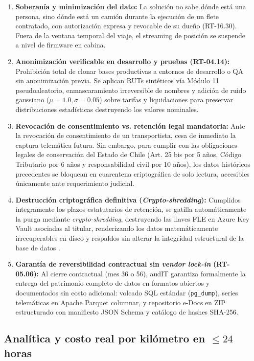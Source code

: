 \begin{enumerate}
    \item \textbf{Soberanía y minimización del dato:} La solución no sabe dónde está una persona, sino dónde está un camión durante la ejecución de un flete contratado, con autorización expresa y revocable de su dueño (RT-16.30). Fuera de la ventana temporal del viaje, el streaming de posición se suspende a nivel de firmware en cabina.
    \item \textbf{Anonimización verificable en desarrollo y pruebas (RT-04.14):} Prohibición total de clonar bases productivas a entornos de desarrollo o QA sin anonimización previa. Se aplican RUTs sintéticos vía Módulo 11 pseudoaleatorio, enmascaramiento irreversible de nombres y adición de ruido gaussiano ($\mu = 1.0, \sigma = 0.05$) sobre tarifas y liquidaciones para preservar distribuciones estadísticas destruyendo los valores nominales.
    \item \textbf{Revocación de consentimiento vs. retención legal mandatoria:} Ante la revocación de consentimiento de un transportista, cesa de inmediato la captura telemática futura. Sin embargo, para cumplir con las obligaciones legales de conservación del Estado de Chile (Art. 25 bis por 5 años, Código Tributario por 6 años y responsabilidad civil por 10 años), los datos históricos precedentes se bloquean en cuarentena criptográfica de solo lectura, accesibles únicamente ante requerimiento judicial.
    \item \textbf{Destrucción criptográfica definitiva (\textit{Crypto-shredding}):} Cumplidos íntegramente los plazos estatutarios de retención, se gatilla automáticamente la purga mediante \textit{crypto-shredding}, destruyendo las llaves FLE en Azure Key Vault asociadas al titular, renderizando los datos matemáticamente irrecuperables en disco y respaldos sin alterar la integridad estructural de la base de datos \parencite{nist80088}.
    \item \textbf{Garantía de reversibilidad contractual sin \textit{vendor lock-in} (RT-05.06):} Al cierre contractual (mes 36 o 56), audIT garantiza formalmente la entrega del patrimonio completo de datos en formatos abiertos y documentados sin costo adicional: volcado SQL estándar (\texttt{pg\_dump}), series telemáticas en Apache Parquet columnar, y repositorio e-Docs en ZIP estructurado con manifiesto JSON Schema y catálogo de hashes SHA-256.
\end{enumerate}

\subsection{Analítica y costo real por kilómetro en $\le 24$ horas}

